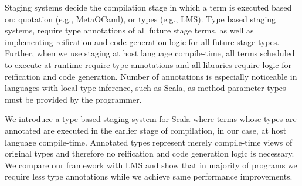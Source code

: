 Staging systems decide the compilation stage in which a term is executed based on: quotation (e.g., MetaOCaml), or types (e.g., LMS). Type based staging systems, require type annotations of all future stage terms, as well as implementing reification and code generation logic for all future stage types. Further, when we use staging at host language compile-time, all terms scheduled to execute at runtime require type annotations and all libraries require logic for reification and code generation. Number of annotations is especially noticeable in languages with local type inference, such as Scala, as method parameter types must be provided by the programmer.

We introduce a type based staging system for Scala where terms whose types are annotated are executed in the earlier stage of compilation, in our case, at host language compile-time. Annotated types represent merely compile-time views of original types and therefore no reification and code generation logic is necessary. We compare our framework with LMS and show that in majority of programs we require less type annotations while we achieve same performance improvements.
